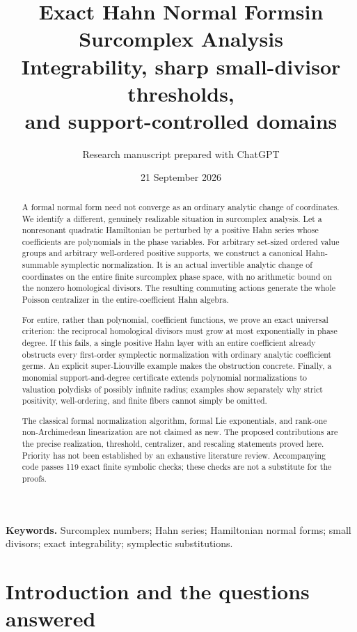 \documentclass[11pt,letterpaper]{article}
\title{\textbf{Exact Hahn Normal Forms\newline in Surcomplex Analysis}\\[7pt]
\large Integrability, sharp small-divisor thresholds,\\
and support-controlled domains}
\author{Research manuscript prepared with ChatGPT}
\date{21 September 2026}
\numberwithin{equation}{section}
\theoremstyle{definition}
\theoremstyle{remark}
\begin{document}
\maketitle
\thispagestyle{empty}
\begin{abstract}
A formal normal form need not converge as an ordinary analytic change of
coordinates. We identify a different, genuinely realizable situation in
surcomplex analysis. Let a nonresonant quadratic Hamiltonian be perturbed by
a positive Hahn series whose coefficients are polynomials in the phase
variables. For arbitrary set-sized ordered value groups and arbitrary
well-ordered positive supports, we construct a canonical Hahn-summable
symplectic normalization. It is an actual invertible analytic change of
coordinates on the entire finite surcomplex phase space, with no arithmetic
bound on the nonzero homological divisors. The resulting commuting actions
generate the whole Poisson centralizer in the entire-coefficient Hahn
algebra.

For entire, rather than polynomial, coefficient functions, we prove an exact
universal criterion: the reciprocal homological divisors must grow at most
exponentially in phase degree. If this fails, a single positive Hahn layer
with an entire coefficient already obstructs every first-order symplectic
normalization with ordinary analytic coefficient germs. An explicit super-Liouville example makes the
obstruction concrete. Finally, a monomial support-and-degree certificate
extends polynomial normalizations to valuation polydisks of possibly
infinite radius; examples show separately why strict positivity,
well-ordering, and finite fibers cannot simply be omitted.

The classical formal normalization algorithm, formal Lie exponentials, and
rank-one non-Archimedean linearization are not claimed as new. The proposed
contributions are the precise realization, threshold, centralizer, and
rescaling statements proved here. Priority has not been established by an
exhaustive literature review. Accompanying code passes 119 exact finite
symbolic checks; these checks are not a substitute for the proofs.
\end{abstract}
\vfill
\noindent\textbf{Keywords.} Surcomplex numbers; Hahn series; Hamiltonian normal
forms; small divisors; exact integrability; symplectic substitutions.
\newpage
{\small\tableofcontents}
\newpage

\section{Introduction and the questions answered}
\label{sec:introduction}
\end{document}
